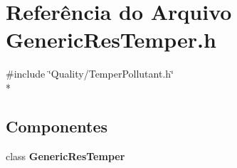 \section{Referência do Arquivo Generic\+Res\+Temper.\+h}
\label{_generic_res_temper_8h}
{\ttfamily \#include \char`\"{}Quality/\+Temper\+Pollutant.\+h\char`\"{}}\\*
\subsection*{Componentes}
\begin{DoxyCompactItemize}
\item 
class {\bf Generic\+Res\+Temper}
\end{DoxyCompactItemize}
